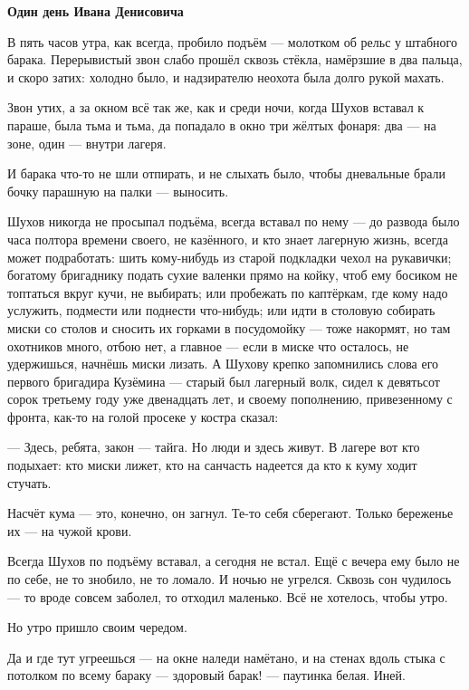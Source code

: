 
\hfuzz=3pt

\centerline{\bf Один день Ивана Денисовича}

\bigskip

В пять часов утра, как всегда, пробило подъём --- молотком об рельс у штабного барака. Перерывистый звон слабо прошёл сквозь стёкла, намёрзшие в два пальца, и скоро затих: холодно было, и надзирателю неохота была долго рукой махать.

Звон утих, а за окном всё так же, как и среди ночи, когда Шухов вставал к параше, была тьма и тьма, да попадало в окно три жёлтых фонаря: два --- на зоне, один --- внутри лагеря.

И барака что-то не шли отпирать, и не слыхать было, чтобы дневальные брали бочку парашную на палки --- выносить.

Шухов никогда не просыпал подъёма, всегда вставал по нему --- до развода было часа полтора времени своего, не казённого, и кто знает лагерную жизнь, всегда может подработать: шить кому-нибудь из старой подкладки чехол на рукавички; богатому бригаднику подать сухие валенки прямо на койку, чтоб ему босиком не топтаться вкруг кучи, не выбирать; или пробежать по каптёркам, где кому надо услужить, подмести или поднести что-нибудь; или идти в столовую собирать миски со столов и сносить их горками в посудомойку --- тоже накормят, но там охотников много, отбою нет, а главное --- если в миске что осталось, не удержишься, начнёшь миски лизать. А Шухову крепко запомнились слова его первого бригадира Кузёмина --- старый был лагерный волк, сидел к девятьсот сорок третьему году уже двенадцать лет, и своему пополнению, привезенному с фронта, как-то на голой просеке у костра сказал:

--- Здесь, ребята, закон --- тайга. Но люди и здесь живут. В лагере вот кто подыхает: кто миски лижет, кто на санчасть надеется да кто к куму ходит стучать.

Насчёт кума --- это, конечно, он загнул. Те-то себя сберегают. Только береженье их --- на чужой крови.

Всегда Шухов по подъёму вставал, а сегодня не встал. Ещё с вечера ему было не по себе, не то знобило, не то ломало. И ночью не угрелся. Сквозь сон чудилось --- то вроде совсем заболел, то отходил маленько. Всё не хотелось, чтобы утро.

Но утро пришло своим чередом.

Да и где тут угреешься --- на окне наледи намётано, и на стенах вдоль стыка с потолком по всему бараку --- здоровый барак! --- паутинка белая. Иней.

